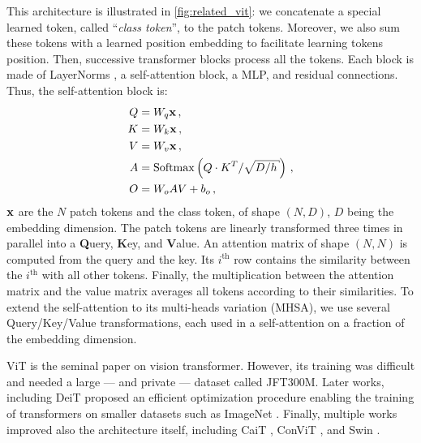 This architecture is illustrated in \autoref{fig:related_vit}: we concatenate a special learned
token, called ``\textit{class token}'', to the patch tokens. Moreover, we also sum these tokens with
a learned position embedding to facilitate learning tokens position. Then, successive
transformer blocks process all the tokens. Each block is made of LayerNorms \citep{ba2016layernorm},
a self-attention block, a \ac{MLP}, and residual connections. Thus, the self-attention block is:
%
\begin{equation}
      \begin{aligned}
            Q & =W_{q} \vx\,,                                                       \\
            K & =W_{k} \vx\,,                                                       \\
            V & =W_{v} \vx\,,                                                       \\
            A & =\operatorname{Softmax}\left(Q \cdot K^{T} / \sqrt{D / h}\right)\,, \\
            O & = W_{o} A V+b_{o}\,,
      \end{aligned}
      \label{sec:related_sa}
\end{equation}
%
\noindent $\mathbf{x}$ are the $N$ patch tokens and the class token, of shape $(N, D)$, $D$ being the
embedding dimension. The patch tokens are linearly transformed three times in parallel into a
\textbf{Q}uery, \textbf{K}ey, and \textbf{V}alue. An attention matrix of shape $(N, N)$ is computed
from the query and the key. Its $i^{\text{th}}$ row contains the similarity between the
$i^{\text{th}}$ with all other tokens. Finally, the multiplication between the attention matrix and
the value matrix averages all tokens according to their similarities. To extend the self-attention
to its multi-heads variation (\ac{MHSA}), we use several Query/Key/Value transformations, each
used in a self-attention on a fraction of the embedding dimension.

ViT \citep{dosovitskiy2020vit} is the seminal paper on vision transformer. However, its training was
difficult and needed a large --- and private --- dataset called JFT300M. Later works, including DeiT
\citep{touvron2021deit} proposed an efficient optimization procedure enabling the training of
transformers on smaller datasets such as ImageNet \citep{russakovsky2015imagenet_ilsvrc}. Finally,
multiple works improved also the architecture itself, including CaiT \citep{touvron2021cait}, ConViT
\citep{dascoli2021convit}, and Swin \citep{liu2021swin}.


